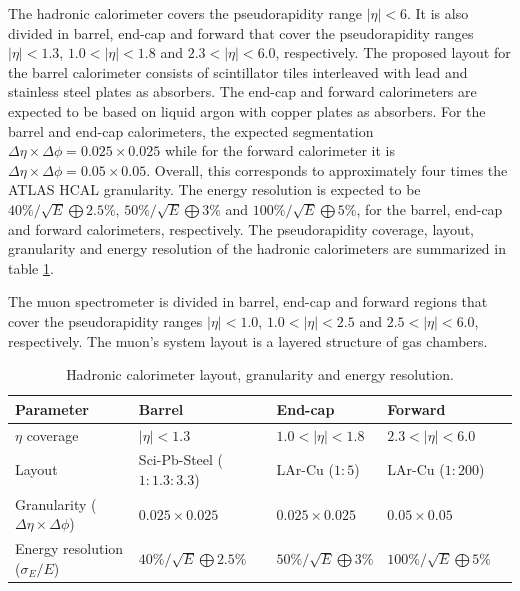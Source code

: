 The hadronic calorimeter \cite{FCC_HCAL} covers the pseudorapidity range $|\eta|<6$. It is also divided in barrel, end-cap and forward that cover the pseudorapidity ranges $|\eta|<1.3$, $1.0<|\eta|<1.8$ and $2.3<|\eta|<6.0$, respectively. The proposed layout for the barrel calorimeter consists of scintillator tiles interleaved with lead and stainless steel plates as absorbers. The end-cap and forward calorimeters are expected to be based on liquid argon with copper plates as absorbers. For the barrel and end-cap calorimeters, the expected segmentation $\Delta\eta\times\Delta\phi=0.025\times 0.025$ while for the forward calorimeter it is $\Delta\eta\times\Delta\phi=0.05\times 0.05$. Overall, this corresponds to approximately four times the ATLAS HCAL granularity. The energy resolution is expected to be $40\%/\sqrt{E}\bigoplus 2.5\%$, $50\%/\sqrt{E}\bigoplus 3\%$ and $100\%/\sqrt{E}\bigoplus 5\%$, for the barrel, end-cap and forward calorimeters, respectively. The pseudorapidity coverage, layout, granularity and energy resolution of the hadronic calorimeters are summarized in table \ref{table:FCC_HCAL}.

The muon spectrometer is divided in barrel, end-cap and forward regions that cover the pseudorapidity ranges $|\eta|<1.0$, $1.0<|\eta|<2.5$ and $2.5<|\eta|<6.0$, respectively. The muon's system layout is a layered structure of gas chambers. 

\renewcommand{\arraystretch}{1.5}

\begin{table}
	\centering
	\caption{Hadronic calorimeter layout, granularity and energy resolution.}
	\begin{tabular}{lllll}
		\toprule 
		\textbf{Parameter} & \textbf{Barrel} & \textbf{End-cap} & \textbf{Forward} & \\
		\midrule
		$\eta$ coverage & $|\eta|<1.3$ & $1.0<|\eta|<1.8$ & $2.3<|\eta|<6.0$ & \\
		\rowcolor{black!7}Layout & Sci-Pb-Steel ($1:1.3:3.3$) & LAr-Cu ($1:5$) & LAr-Cu ($1:200$) & \\
		 Granularity ($\Delta \eta \times \Delta \phi$)  & $0.025\times 0.025$ & $0.025\times 0.025$ & $0.05\times 0.05$ &\\
		\rowcolor{black!7}Energy resolution ($\sigma_E/E$) & $40\%/\sqrt{E}\bigoplus 2.5\%$ & $50\%/\sqrt{E}\bigoplus 3\%$ & $100\%/\sqrt{E}\bigoplus 5\%$ & \\
		\bottomrule
	\end{tabular}
	\label{table:FCC_HCAL}
\end{table}

